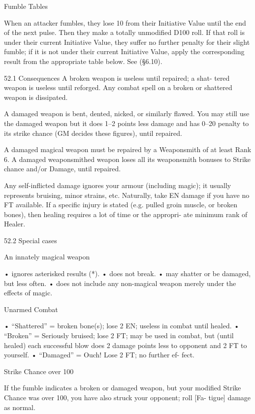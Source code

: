 \begin{Chapter}{Fumble Tables}

When an attacker fumbles, they lose 10 from their 
Initiative  Value  until  the  end  of  the  next  pulse. 
Then they make a totally unmodified D100 roll.  If 
that roll is under their current Initiative Value, they 
suffer  no  further  penalty  for  their  slight  fumble;  if 
it  is  not under  their  current  Initiative  Value,  apply 
the corresponding result from the appropriate table 
below. See (§6.10). 

52.1 Consequences 
A  broken  weapon  is  useless until  repaired;  a  shat-
tered weapon is useless until reforged. Any combat 
spell on a broken or shattered weapon is dissipated. 

A  damaged  weapon  is  bent,  dented,  nicked,  or 
similarly  flawed.  You  may  still  use  the  damaged 
weapon but it does 1–2 points less damage and has 
0–20 penalty to its strike chance (GM decides these 
figures), until repaired. 

A damaged magical weapon must be repaired by a 
Weaponsmith  of  at  least  Rank  6.  A  damaged 
weaponsmithed  weapon  loses  all  its  weaponsmith 
bonuses  to  Strike  chance  and/or  Damage,  until 
repaired. 

Any  self-inflicted  damage  ignores  your  armour 
(including  magic);  it  usually  represents  bruising, 
minor  strains,  etc.  Naturally,  take  EN  damage  if 
you  have  no  FT  available.  If  a  specific  injury  is 
stated (e.g. pulled groin muscle, or broken bones), 
then healing requires a lot of time or the appropri-
ate minimum rank of Healer. 

52.2 Special cases 

An innately magical weapon  

• ignores asterisked results (*).  
• does not break.  
• may shatter or be damaged, but less often.  
• does not include any non-magical weapon merely 
under the effects of magic. 

Unarmed Combat  

•  “Shattered” = broken bone(s); lose 2 EN; useless 
in combat until healed.  
•  “Broken” = Seriously bruised; lose 2 FT; may be 
used  in  combat,  but  (until  healed)  each  successful 
blow does 2 damage points less to opponent and 2 
FT to yourself.  
•    “Damaged”  =  Ouch!  Lose  2  FT;  no  further  ef-
fect. 

Strike Chance over 100 

If  the  fumble  indicates  a  broken  or  damaged 
weapon, but your modified Strike Chance was over 
100, you have also struck your opponent; roll [Fa-
tigue] damage as normal. 


\end{Chapter}
